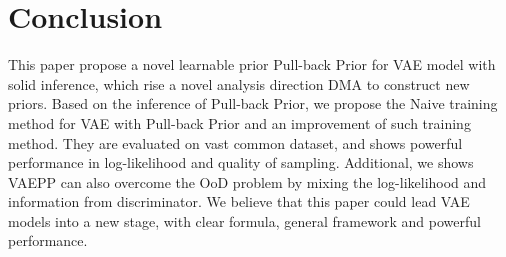 \section{Conclusion}

This paper propose a novel learnable prior Pull-back Prior for VAE model with solid inference, which rise a novel analysis direction DMA to construct new priors. Based on the inference of Pull-back Prior, we propose the Naive training method for VAE with Pull-back Prior and an improvement of such training method. They are evaluated  on vast common dataset, and shows powerful performance in log-likelihood and quality of sampling. Additional, we shows VAEPP can also overcome the OoD problem by mixing the log-likelihood and information from discriminator. We believe that this paper could lead VAE models into a new stage, with clear formula, general framework and powerful performance. 